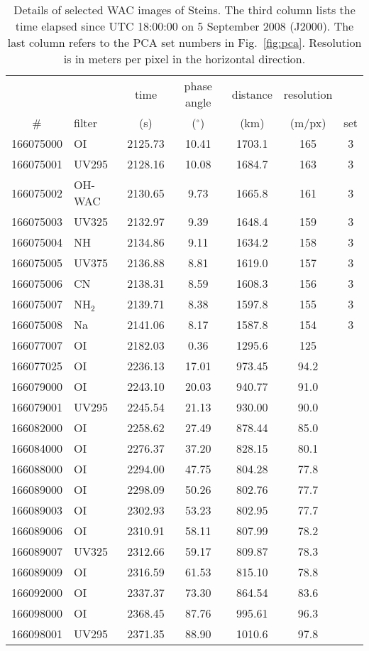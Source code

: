 \documentclass[preprint,3p,authoryear]{elsarticle}
\begin{document}
\begin{table}
\centering
\caption{Details of selected WAC images of Steins. The third column lists the time elapsed since UTC 18:00:00 on 5 September 2008 (J2000). The last column refers to the PCA set numbers in Fig.~\ref{fig:pca}. Resolution is in meters per pixel in the horizontal direction.}
\vspace{5mm}
\begin{tabular}{|clccccc|}
\hline
\hline
   &        & time & phase angle & distance & resolution & \\
\# & filter & (s)  & ($^\circ$)  & (km)     & (m/px)     & set \\
\hline
166075000 & OI     & 2125.73 & 10.41 & 1703.1 & 165  & 3 \\
166075001 & UV295  & 2128.16 & 10.08 & 1684.7 & 163  & 3 \\
166075002 & OH-WAC & 2130.65 &  9.73 & 1665.8 & 161  & 3 \\
166075003 & UV325  & 2132.97 &  9.39 & 1648.4 & 159  & 3 \\
166075004 & NH     & 2134.86 &  9.11 & 1634.2 & 158  & 3 \\
166075005 & UV375  & 2136.88 &  8.81 & 1619.0 & 157  & 3 \\
166075006 & CN     & 2138.31 &  8.59 & 1608.3 & 156  & 3 \\
166075007 & NH$_2$ & 2139.71 &  8.38 & 1597.8 & 155  & 3 \\
166075008 & Na     & 2141.06 &  8.17 & 1587.8 & 154  & 3 \\
166077007 & OI     & 2182.03 &  0.36 & 1295.6 & 125  &   \\
166077025 & OI     & 2236.13 & 17.01 & 973.45 & 94.2 &   \\
166079000 & OI     & 2243.10 & 20.03 & 940.77 & 91.0 &   \\
166079001 & UV295  & 2245.54 & 21.13 & 930.00 & 90.0 &   \\
166082000 & OI     & 2258.62 & 27.49 & 878.44 & 85.0 &   \\
166084000 & OI     & 2276.37 & 37.20 & 828.15 & 80.1 &   \\
166088000 & OI     & 2294.00 & 47.75 & 804.28 & 77.8 &   \\
166089000 & OI     & 2298.09 & 50.26 & 802.76 & 77.7 &   \\
166089003 & OI     & 2302.93 & 53.23 & 802.95 & 77.7 &   \\
166089006 & OI     & 2310.91 & 58.11 & 807.99 & 78.2 &   \\
166089007 & UV325  & 2312.66 & 59.17 & 809.87 & 78.3 &   \\
166089009 & OI     & 2316.59 & 61.53 & 815.10 & 78.8 &   \\
166092000 & OI     & 2337.37 & 73.30 & 864.54 & 83.6 &   \\
166098000 & OI     & 2368.45 & 87.76 & 995.61 & 96.3 &   \\
166098001 & UV295  & 2371.35 & 88.90 & 1010.6 & 97.8 &   \\
\hline
\hline
\end{tabular}
\label{tab:wac_images}
\end{table}
\end{document}
